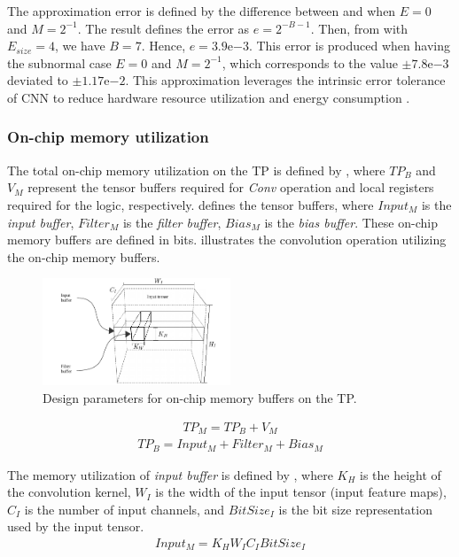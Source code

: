 The approximation error is defined by the difference between  and  when $E=0$ and $M=2^{-1}$. The result defines the error as $e=2^{-B-1}$. Then, from  with $E_{size}=4$, we have $B=7$. Hence, $e=3.9\mathrm{e}{-3}$. This error is produced when having the subnormal case $E=0$ and $M=2^{-1}$, which corresponds to the value $\pm7.8\mathrm{e}{-3}$ deviated to $\pm1.17\mathrm{e}{-2}$. This approximation leverages the intrinsic error tolerance of CNN to reduce hardware resource utilization and energy consumption \cite{du2014leveraging}.


\subsubsection{\textbf{On-chip memory utilization}}
\label{sec:memory_utilization}
The total on-chip memory utilization on the TP is defined by , where $TP_B$ and $V_{M}$ represent the tensor buffers required for \emph{Conv} operation and local registers required for the logic, respectively.  defines the tensor buffers, where $Input_{M}$ is the \emph{input buffer}, $Filter_{M}$ is the \emph{filter buffer}, $Bias_{M}$ is the \emph{bias buffer}. These on-chip memory buffers are defined in bits.  illustrates the convolution operation utilizing the on-chip memory buffers.
\begin{figure}[t!]
	\centering
	\includegraphics[width=0.5\textwidth]{./chapters/cnn_accelerator/figures/accelerator_buffers.pdf}
	\caption{Design parameters for on-chip memory buffers on the TP.}
	\label{fig:accelerator_buffers}
\end{figure}
\begin{eqnarray} \label{eq:tp_memory}
TP_{M}=TP_B+V_{M}
\end{eqnarray}
\begin{eqnarray} \label{eq:tp_memory_buffer}
TP_{B}=Input_{M}+Filter_{M}+Bias_{M}
\end{eqnarray}

The memory utilization of \emph{input buffer} is defined by , where $K_{H}$ is the height of the convolution kernel, $W_{I}$ is the width of the input tensor (input feature maps), $C_{I}$ is the number of input channels, and $BitSize_{I}$ is the bit size representation used by the input tensor.
\begin{eqnarray} \label{eq:input_memory}
Input_{M}=K_{H}W_{I}C_{I}BitSize_{I}
\end{eqnarray}

